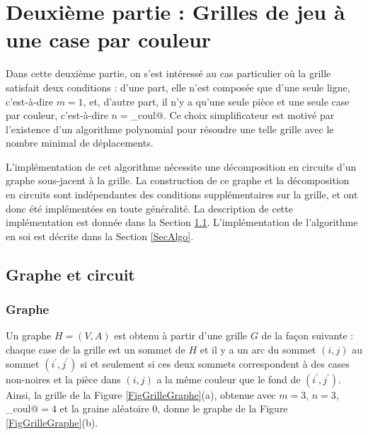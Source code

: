 \documentclass[a4paper,12pt]{article}
\numberwithin{equation}{section}
\begin{document}
\section{Deuxième partie : Grilles de jeu à une case par couleur}

Dans cette deuxième partie, on s'est intéressé au cas particulier où la grille satisfait deux conditions : d'une part, elle n'est composée que d'une seule ligne, c'est-à-dire $m = 1$, et, d'autre part, il n'y a qu'une seule pièce et une seule case par couleur, c'est-à-dire $n = {}$\verb@nb_coul@. Ce choix simplificateur est motivé par l'existence d'un algorithme polynomial pour résoudre une telle grille avec le nombre minimal de déplacements.

L'implémentation de cet algorithme nécessite une décomposition en circuits d'un graphe sous-jacent à la grille. La construction de ce graphe et la décomposition en circuits sont indépendantes des conditions supplémentaires sur la grille, et ont donc été implémentées en toute généralité. La description de cette implémentation est donnée dans la Section \ref{SecGrapheCircuits}. L'implémentation de l'algorithme en soi est décrite dans la Section \ref{SecAlgo}.

\subsection{Graphe et circuit}
\label{SecGrapheCircuits}

\subsubsection*{Graphe}

Un graphe $H = (V, A)$ est obtenu à partir d'une grille $G$ de la façon suivante : chaque case de la grille est un sommet de $H$ et il y a un arc du sommet $(i, j)$ au sommet $(i^\prime, j^\prime)$ si et seulement si ces deux sommets correspondent à des cases non-noires et la pièce dans $(i, j)$ a la même couleur que le fond de $(i^\prime, j^\prime)$. Ainsi, la grille de la Figure \ref{FigGrilleGraphe}(a), obtenue avec $m = 3$, $n = 3$, \verb@nb_coul@${} = 4$ et la graine aléatoire $0$, donne le graphe de la Figure \ref{FigGrilleGraphe}(b).
\end{document}
